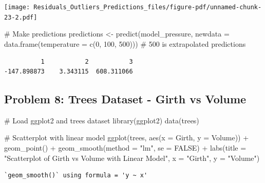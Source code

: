 \documentclass[
  letterpaper,
  DIV=11,
  numbers=noendperiod]{scrreprt}
\newenvironment{Shaded}{\begin{snugshade}}{\end{snugshade}}
\newcommand{\AttributeTok}[1]{\textcolor[rgb]{0.40,0.45,0.13}{#1}}
\newcommand{\CommentTok}[1]{\textcolor[rgb]{0.37,0.37,0.37}{#1}}
\newcommand{\ConstantTok}[1]{\textcolor[rgb]{0.56,0.35,0.01}{#1}}
\newcommand{\DecValTok}[1]{\textcolor[rgb]{0.68,0.00,0.00}{#1}}
\newcommand{\FunctionTok}[1]{\textcolor[rgb]{0.28,0.35,0.67}{#1}}
\newcommand{\NormalTok}[1]{\textcolor[rgb]{0.00,0.23,0.31}{#1}}
\newcommand{\OtherTok}[1]{\textcolor[rgb]{0.00,0.23,0.31}{#1}}
\newcommand{\SpecialCharTok}[1]{\textcolor[rgb]{0.37,0.37,0.37}{#1}}
\newcommand{\StringTok}[1]{\textcolor[rgb]{0.13,0.47,0.30}{#1}}
\begin{document}
\texttt{[image: Residuals\_Outliers\_Predictions\_files/figure-pdf/unnamed-chunk-23-2.pdf]}

\begin{Shaded}
\begin{Highlighting}[]
\CommentTok{\# Make predictions}
\NormalTok{predictions }\OtherTok{\textless{}{-}} \FunctionTok{predict}\NormalTok{(model\_pressure, }\AttributeTok{newdata =} \FunctionTok{data.frame}\NormalTok{(}\AttributeTok{temperature =} \FunctionTok{c}\NormalTok{(}\DecValTok{0}\NormalTok{, }\DecValTok{100}\NormalTok{, }\DecValTok{500}\NormalTok{))) }\CommentTok{\# 500 is extrapolated}
\NormalTok{predictions}
\end{Highlighting}
\end{Shaded}

\begin{verbatim}
          1           2           3 
-147.898873    3.343115  608.311066 
\end{verbatim}

\subsection*{Problem 8: Trees Dataset - Girth vs
Volume}\label{problem-8-trees-dataset---girth-vs-volume-2}

\begin{Shaded}
\begin{Highlighting}[]
\CommentTok{\# Load ggplot2 and trees dataset}
\FunctionTok{library}\NormalTok{(ggplot2)}
\FunctionTok{data}\NormalTok{(trees)}

\CommentTok{\# Scatterplot with linear model}
\FunctionTok{ggplot}\NormalTok{(trees, }\FunctionTok{aes}\NormalTok{(}\AttributeTok{x =}\NormalTok{ Girth, }\AttributeTok{y =}\NormalTok{ Volume)) }\SpecialCharTok{+}
  \FunctionTok{geom\_point}\NormalTok{() }\SpecialCharTok{+}
  \FunctionTok{geom\_smooth}\NormalTok{(}\AttributeTok{method =} \StringTok{"lm"}\NormalTok{, }\AttributeTok{se =} \ConstantTok{FALSE}\NormalTok{) }\SpecialCharTok{+}
  \FunctionTok{labs}\NormalTok{(}\AttributeTok{title =} \StringTok{"Scatterplot of Girth vs Volume with Linear Model"}\NormalTok{, }\AttributeTok{x =} \StringTok{"Girth"}\NormalTok{, }\AttributeTok{y =} \StringTok{"Volume"}\NormalTok{)}
\end{Highlighting}
\end{Shaded}

\begin{verbatim}
`geom_smooth()` using formula = 'y ~ x'
\end{verbatim}
\end{document}
